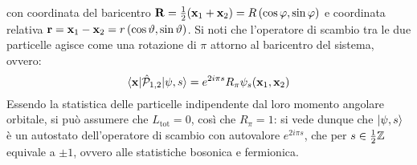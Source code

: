 con coordinata del baricentro $ \mathbf{R} = \frac{1}{2} (\mathbf{x}_1 + \mathbf{x}_2) = R \left( \cos \varphi, \sin \varphi \right) $ e coordinata relativa $ \mathbf{r} = \mathbf{x}_1 - \mathbf{x}_2 = r \left( \cos \vartheta, \sin \vartheta \right) $. Si noti che l'operatore di scambio tra le due particelle agisce come una rotazione di $ \pi $ attorno al baricentro del sistema, ovvero:
\begin{equation*}
	\braket{\mathbf{x} | \hat{\mathcal{P}}_{1,2} | \psi,s} = e^{2i \pi s} R_\pi \psi_s(\mathbf{x}_1, \mathbf{x}_2)
\end{equation*}
Essendo la statistica delle particelle indipendente dal loro momento angolare orbitale, si può assumere che $ L_\mathrm{tot} = 0 $, così che $ R_\pi = 1 $: si vede dunque che $ \ket{\psi,s} $ è un autostato dell'operatore di scambio con autovalore $ e^{2i \pi s} $, che per $ s \in \frac{1}{2} \mathbb{Z} $ equivale a $ \pm 1 $, ovvero alle statistiche bosonica e fermionica.










